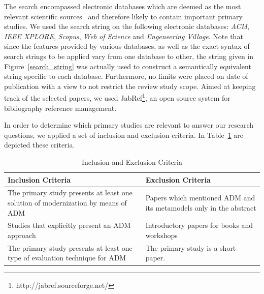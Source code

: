 The search encompassed electronic databases which are deemed as the most relevant scientific sources~\cite{Kitchenham} and therefore likely to contain important primary studies. We used the search string on the following electronic databases: \textit{ACM}, \textit{IEEE XPLORE}, \textit{Scopus}, \textit{Web of Science} and \textit{Engeneering Village}. Note that since the features provided by various databases, as well as the exact syntax of search strings to be applied vary from one database to other, the string given in Figure~\ref{search_string} was actually used to construct a semantically equivalent string specific to each database. Furthermore, no limits were placed on date of publication with a view to not restrict the review study scope. Aimed at keeping track of the selected papers, we used JabRef\footnote{http://jabref.sourceforge.net/}, an open source system for bibliography reference management. 



In order to determine which primary studies are relevant to answer our research questions, we applied a set of inclusion and exclusion criteria. In Table~\ref{tab:inclusion_exclusion_criteria} are depicted these criteria.



\begin{table}
\centering
\caption{Inclusion and Exclusion Criteria\label{tab:inclusion_exclusion_criteria}}
\begin{tabularx}{
1.0\textwidth}{|X|X|}
\hline 
Inclusion Criteria & Exclusion Criteria\tabularnewline
\hline 
\hline 
The primary study presents at least one solution of modernization
by means of ADM & Papers which mentioned ADM and its metamodels only in the abstract\tabularnewline
\hline 
Studies that explicitly present an ADM approach & Introductory papers for books and workshops\tabularnewline
\hline 
The primary study presents at least one type of evaluation technique
for ADM & The primary study is a short paper.\tabularnewline
\hline 
\end{tabularx}
\end{table}

